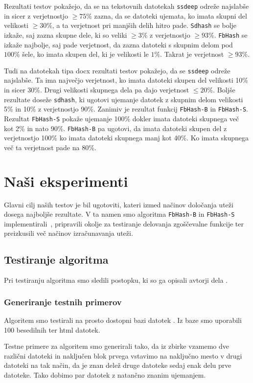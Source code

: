 \documentclass{acm_proc_article-sp}
\begin{document}
Rezultati testov pokažejo, da se na tekstovnih datotekah \texttt{ssdeep} odreže najslabše in sicer z verjetnostjo $\geq 75\%$ zazna, da se datoteki ujemata, ko imata skupni del velikosti $\geq 30\%$, a ta verjetnost pri manjših delih hitro pade. \texttt{Sdhash} se bolje izkaže, saj zazna skupne dele, ki so veliki $\geq 3\%$ z verjetnostjo $\geq 93\%$. \texttt{FbHash} se izkaže najbolje, saj pade verjetnost, da zazna datoteki s skupnim delom pod $100\%$ šele, ko imata skupen del, ki je velikosti le $1\%$. Takrat je verjetnost $\geq 93\%$.

Tudi na datotekah tipa docx rezultati testov pokažejo, da se \texttt{ssdeep} odreže najslabše. Ta ima največjo verjetnost, ko imata datoteki skupen del velikosti 10\% in sicer 30\%. Drugi velikosti skupnega dela pa dajo verjetnost $\leq 20\%$. Boljše rezultate doseže \texttt{sdhash}, ki ugotovi ujemanje datotek z skupnim delom velikosti 5\% in 10\% z verjetnostjo 90\%. Zanimiv je rezultat funkcij \texttt{FbHash-B} in \texttt{FbHash-S}. Rezultat \texttt{FbHash-S} pokaže ujemanje 100\% dokler imata datoteki skupnega več kot 2\% in nato 90\%. \texttt{FbHash-B} pa ugotovi, da imata datoteki skupen del z verjetnostjo 100\% ko imata datoteki skupnega manj kot 40\%. Ko imata skupnega več ta verjetnost pade na 80\%.
\\
\section{Na\v{s}i eksperimenti}
Glavni cilj naših testov je bil ugotoviti, kateri izmed načinov določanja uteži dosega najboljše rezultate. V ta namen smo algoritma \texttt{FbHash-B} in \texttt{FbHash-S} implementirali~\cite{repo}, pripravili okolje za testiranje delovanja zgoščevalne funkcije ter preizkusili več načinov izračunavanja uteži.

\subsection{Testiranje algoritma}
Pri testiranju algoritma smo sledili postopku, ki so ga opisali avtorji dela \cite{fbhash}.

\subsubsection{Generiranje testnih primerov}
Algoritem smo testirali na prosto dostopni bazi datotek \cite{zdataset}. Iz baze smo uporabili 100 besedilnih ter html datotek.

Testne primere za algoritem smo generirali tako, da iz zbirke vzamemo dve različni datoteki in naključen blok prvega vstavimo na naključno mesto v drugi datoteki na tak način, da je znan delež druge datoteke sedaj enak delu prve datoteke. Tako dobimo par datotek z natančno znanim ujemanjem.
\end{document}
